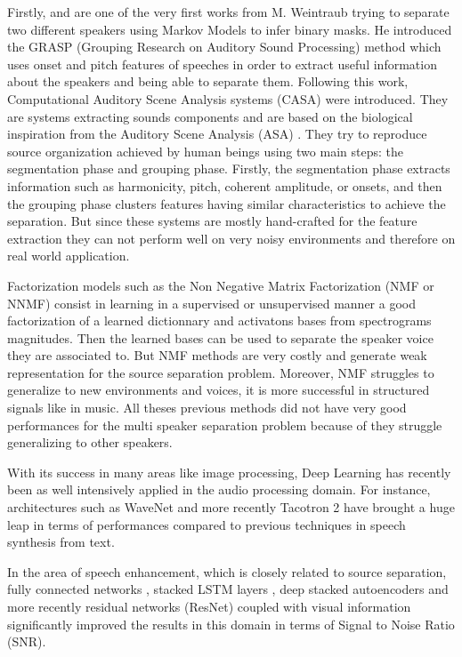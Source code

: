\documentclass[master, tikz, final,11pt, dvipdfmx]{iscs-thesis}
\begin{document}
Firstly, \cite{Weintraub:1985:TCM:912498} and \cite{GRASP} are one of the very first works from M. Weintraub trying to separate two different speakers using Markov Models to infer binary masks. He introduced the GRASP (Grouping Research on Auditory Sound Processing) method which uses onset and pitch features of speeches in order to extract useful information about the speakers and being able to separate them.
Following this work, Computational Auditory Scene Analysis systems (CASA) \cite{CASA1, CASA2} were introduced. They are systems extracting sounds components and are based on the biological inspiration from the Auditory Scene Analysis (ASA) \cite{ASA}. They try to reproduce source organization achieved by human beings using two main steps: the segmentation phase and grouping phase. Firstly, the segmentation phase extracts information such as harmonicity, pitch, coherent amplitude, or onsets, and then the grouping phase clusters features having similar characteristics to achieve the separation. But since these systems are mostly hand-crafted for the feature extraction they can not perform well on very noisy environments and therefore on real world application. 

Factorization models such as the Non Negative Matrix Factorization \cite{SNMF, NMFalgo} (NMF or NNMF) consist in learning in a supervised or unsupervised manner a good factorization of a learned dictionnary and activatons bases from spectrograms magnitudes. Then the learned bases can be used to separate the speaker voice they are associated to. But NMF methods are very costly and generate weak representation for the source separation problem. Moreover, NMF struggles to generalize to new environments and voices, it is more successful in structured signals like in music.
All theses previous methods did not have very good performances for the multi speaker separation problem because of they struggle generalizing to other speakers.

With its success in many areas like image processing, Deep Learning has recently been as well intensively applied in the audio processing domain. For instance, architectures such as WaveNet \cite{WaveNet} and more recently Tacotron 2 \cite{Tacotron2} have brought a huge leap in terms of performances compared to previous techniques in speech synthesis from text.

In the area of speech enhancement, which is closely related to source separation, fully connected networks \cite{DLSS}, stacked LSTM layers \cite{SELSTM, DAVSE}, deep stacked autoencoders \cite{AESE} and more recently residual networks (ResNet) coupled with visual information \cite{SpeechEnh} significantly improved the results in this domain in terms of Signal to Noise Ratio (SNR).
\end{document}
